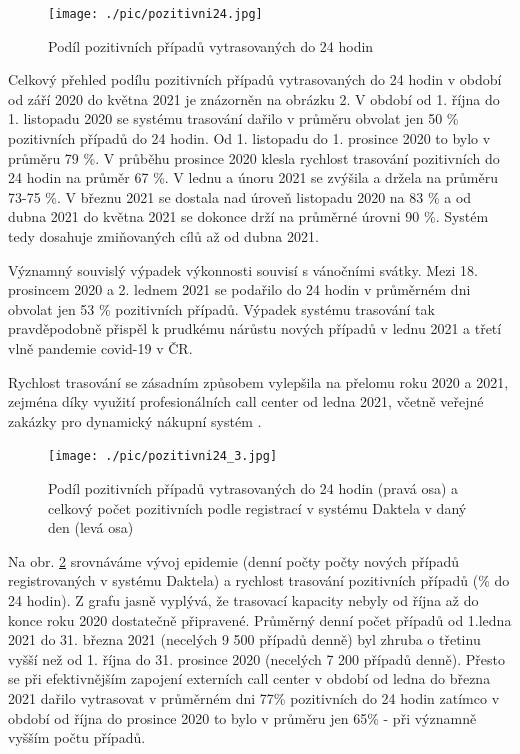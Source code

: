 \begin{figure}[ht]
    \centering
    \texttt{[image: ./pic/pozitivni24.jpg]}
    \caption{Podíl pozitivních případů vytrasovaných do 24 hodin}
    \label{fig:pozitivni24}
\end{figure}

Celkový přehled podílu pozitivních případů vytrasovaných do 24 hodin v období od září 2020 do května 2021 je znázorněn na obrázku 2. V období od 1. října do 1. listopadu 2020 se systému trasování dařilo v průměru obvolat jen 50 \% pozitivních případů do 24 hodin. Od 1. listopadu do 1. prosince 2020 to bylo v průměru 79 \%. V průběhu prosince 2020 klesla rychlost trasování pozitivních do 24 hodin na průměr 67 \%. V lednu a únoru 2021 se zvýšila a držela na průměru 73-75 \%. V březnu 2021 se dostala nad úroveň listopadu 2020 na 83 \% a od dubna 2021 do května 2021 se dokonce drží na průměrné úrovni 90 \%. Systém tedy dosahuje zmiňovaných cílů až od dubna 2021.

Významný souvislý výpadek výkonnosti souvisí s vánočními svátky. Mezi 18. prosincem 2020 a 2. lednem 2021 se podařilo do 24 hodin v průměrném dni obvolat jen 53 \% pozitivních případů. Výpadek systému trasování tak pravděpodobně přispěl k prudkému nárůstu nových případů v lednu 2021 a třetí vlně pandemie covid-19 v ČR.

Rychlost trasování se zásadním způsobem vylepšila na přelomu roku 2020 a 2021, zejména díky využití profesionálních call center od ledna 2021, včetně veřejné zakázky pro dynamický nákupní systém \cite{tr_hlidac01}.

\begin{figure}[ht]
    \centering
    \texttt{[image: ./pic/pozitivni24\_3.jpg]}
    \caption{Podíl pozitivních případů vytrasovaných do 24 hodin (pravá osa) a celkový počet pozitivních podle registrací v systému Daktela v daný den (levá osa)}
    \label{fig:pozitivni24_3}
\end{figure}

Na obr. \ref{fig:pozitivni24_3} srovnáváme vývoj epidemie (denní počty počty nových případů registrovaných v systému Daktela) a rychlost trasování pozitivních případů (\% do 24 hodin). Z grafu jasně vyplývá, že trasovací kapacity nebyly od října až do konce roku 2020 dostatečně připravené. Průměrný denní počet případů od 1.ledna 2021 do 31. března 2021 (necelých 9 500 případů denně) byl zhruba o třetinu vyšší než od 1. října do 31. prosince 2020 (necelých 7 200 případů denně). Přesto se při efektivnějším zapojení externích call center v období od ledna do března 2021 dařilo vytrasovat v průměrném dni 77\% pozitivních do 24 hodin zatímco v období od října do prosince 2020 to bylo v průměru jen 65\% - při významně vyšším počtu případů.

